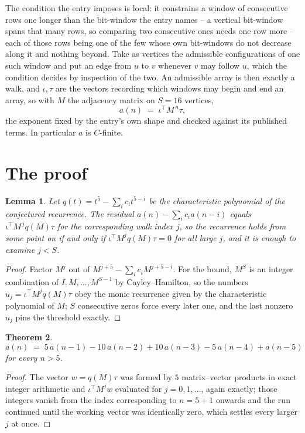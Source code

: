 \documentclass[11pt,a4paper]{article}
\theoremstyle{plain}
\newtheorem{theorem}{Theorem}
\newtheorem{lemma}[theorem]{Lemma}
\theoremstyle{definition}
\begin{document}
The condition the entry imposes is local: it constrains a window of consecutive rows one longer than the bit-window the entry names -- a vertical bit-window spans that many rows, so comparing two consecutive ones needs one row more -- each of those rows being one of the few whose own bit-windows do not decrease along it and nothing beyond. Take as vertices the admissible configurations of one such window and put an edge from $u$ to $v$ whenever $v$ may follow $u$, which the condition decides by inspection of the two.
An admissible array is then exactly a walk, and $\iota,\tau$ are the vectors recording which windows may begin and end an array, so with $M$ the adjacency matrix on $S=16$ vertices,
\[
a(n)\;=\;\iota^{\!\top}M^{\,n}\tau ,
\]
the exponent fixed by the entry's own shape and checked against its published terms. In
particular $a$ is $C$-finite.

\section{The proof}

\begin{lemma}\label{lem:crit}
Let $q(t)=t^{5}-\sum_i c_it^{5-i}$ be the characteristic polynomial of the
conjectured recurrence. The residual $a(n)-\sum_ic_ia(n-i)$ equals
$\iota^{\!\top}M^{\,j}q(M)\tau$ for the corresponding walk index $j$, so the recurrence
holds from some point on if and only if $\iota^{\!\top}M^{j}q(M)\tau=0$ for all large $j$,
and it is enough to examine $j<S$.
\end{lemma}

\begin{proof}
Factor $M^{j}$ out of $M^{j+5}-\sum_ic_iM^{j+5-i}$. For the bound, $M^{S}$
is an integer combination of $I,M,\dots,M^{S-1}$ by Cayley--Hamilton, so the numbers
$u_j=\iota^{\!\top}M^{j}q(M)\tau$ obey the monic recurrence given by the characteristic
polynomial of $M$; $S$ consecutive zeros force every later one, and the last nonzero $u_j$
pins the threshold exactly.
\end{proof}

\begin{theorem}
\[
a(n)\;=\;5\,a(n-1) - 10\,a(n-2) + 10\,a(n-3) - 5\,a(n-4) + a(n-5)
\]
for every $n>5$.
\end{theorem}

\begin{proof}
The vector $w=q(M)\tau$ was formed by $5$ matrix--vector products in exact integer
arithmetic and $\iota^{\!\top}M^{j}w$ evaluated for $j=0,1,\dots$, again exactly; those
integers vanish from the index corresponding to $n=5+1$ onwards and the run continued
until the working vector was identically zero, which settles every larger $j$ at once.
\end{proof}
\end{document}
